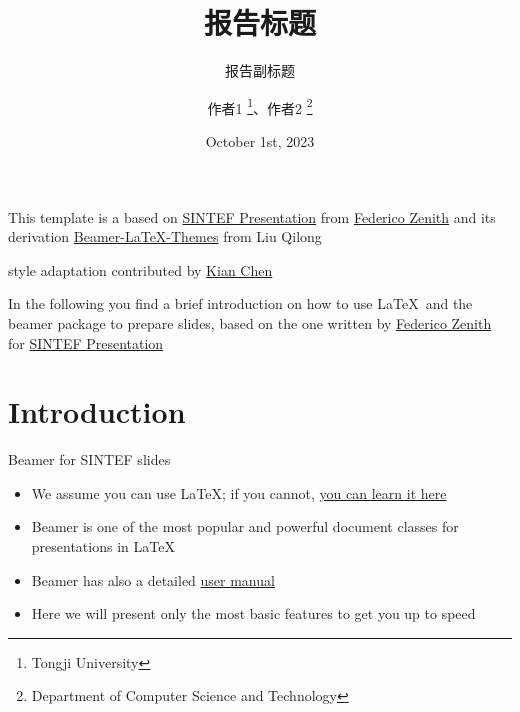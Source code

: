 \documentclass{beamer}
\title{报告标题}
\subtitle{报告副标题}
\author{作者1 \thanks{Tongji University}、作者2 \thanks{Department of Computer Science and Technology}}
\date{October 1st, 2023}
\newcommand{\hrefcol}[2]{\textcolor{cyan}{\href{#1}{#2}}}
\begin{document}
\maketitle

\begin{frame}

      This template is a based on \hrefcol{https://www.overleaf.com/latex/templates/sintef-presentation/jhbhdffczpnx}{SINTEF Presentation} from \hrefcol{mailto:federico.zenith@sintef.no}{Federico Zenith} and its derivation \hrefcol{https://github.com/TOB-KNPOB/Beamer-LaTeX-Themes}{Beamer-LaTeX-Themes} from Liu Qilong

      \vspace{\baselineskip}

      style adaptation contributed by \hrefcol{https://https://github.com/Kian-Chen/TongjiBeamer}{Kian Chen}

      \vspace{\baselineskip}

      In the following you find a brief introduction on how to use \LaTeX\ and the beamer package to prepare slides, based on the one written by \hrefcol{mailto:federico.zenith@sintef.no}{Federico Zenith} for \hrefcol{https://www.overleaf.com/latex/templates/sintef-presentation/jhbhdffczpnx}{SINTEF Presentation}


\end{frame}

\section{Introduction}

\begin{frame}{Beamer for SINTEF slides}
      \begin{itemize}
            \item We assume you can use \LaTeX; if you cannot,
                  \hrefcol{http://en.wikibooks.org/wiki/LaTeX/}{you can learn it here}
            \item Beamer is one of the most popular and powerful document
                  classes for presentations in \LaTeX
            \item Beamer has also a detailed
                  \hrefcol{http://www.ctan.org/tex-archive/macros/latex/contrib/beamer/doc/beameruserguide.pdf}{user
                        manual}
            \item Here we will present only the most basic features to get you up to speed
      \end{itemize}
\end{frame}
\end{document}
